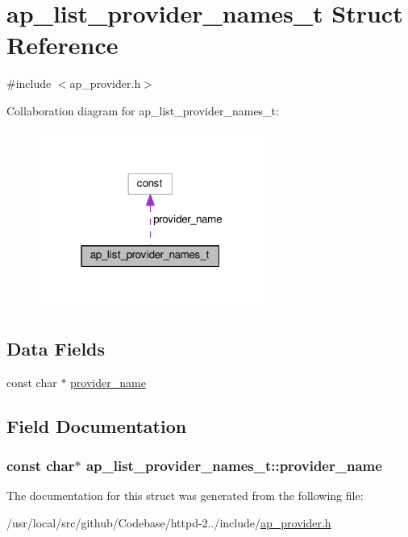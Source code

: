 \hypertarget{structap__list__provider__names__t}{}\section{ap\+\_\+list\+\_\+provider\+\_\+names\+\_\+t Struct Reference}
\label{structap__list__provider__names__t}


{\ttfamily \#include $<$ap\+\_\+provider.\+h$>$}



Collaboration diagram for ap\+\_\+list\+\_\+provider\+\_\+names\+\_\+t\+:
\nopagebreak
\begin{figure}[H]
\begin{center}
\leavevmode
\includegraphics[width=211pt]{structap__list__provider__names__t__coll__graph}
\end{center}
\end{figure}
\subsection*{Data Fields}
\begin{DoxyCompactItemize}
\item 
const char $\ast$ \hyperlink{structap__list__provider__names__t_aa319bf306aec1ce526f4e6e19c538ff9}{provider\+\_\+name}
\end{DoxyCompactItemize}


\subsection{Field Documentation}
\subsubsection[{\texorpdfstring{provider\+\_\+name}{provider_name}}]{\setlength{\rightskip}{0pt plus 5cm}const char$\ast$ ap\+\_\+list\+\_\+provider\+\_\+names\+\_\+t\+::provider\+\_\+name}\hypertarget{structap__list__provider__names__t_aa319bf306aec1ce526f4e6e19c538ff9}{}\label{structap__list__provider__names__t_aa319bf306aec1ce526f4e6e19c538ff9}


The documentation for this struct was generated from the following file\+:\begin{DoxyCompactItemize}
\item 
/usr/local/src/github/\+Codebase/httpd-\/2../include/\hyperlink{ap__provider_8h}{ap\+\_\+provider.\+h}\end{DoxyCompactItemize}
